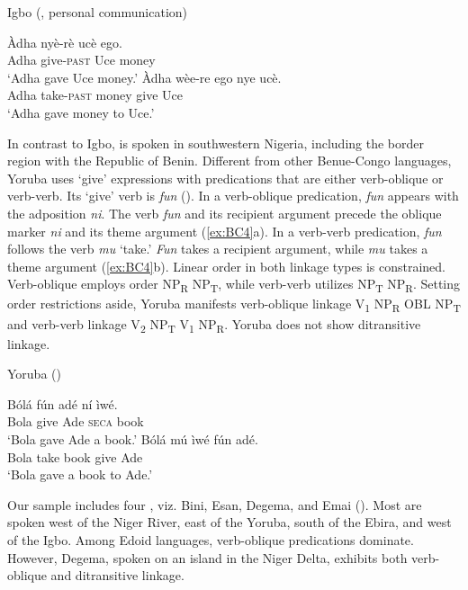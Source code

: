 \documentclass[output=paper,colorlinks,citecolor=brown]{langscibook}
\begin{document}
\ea \label{ex:BC3} Igbo (\cite[122]{Uwalaka1988}, personal communication)
\begin{xlist}
\ex
\gll Àdha		nyè-rè				ucè		ego.\\
						Adha		give-\textsc{past}		Uce		money\\
\glt						‘Adha gave Uce money.’
\ex 
\gll Àdha		wèe-re				ego			nye		ucè.\\
						Adha		take-\textsc{past}		money	give	Uce \\
\glt ‘Adha gave money to Uce.’
\end{xlist}
\z

In contrast to Igbo,  is spoken in southwestern Nigeria, including the border region with the Republic of Benin. Different from other Benue-Congo languages, Yoruba uses ‘give’ expressions with predications that are either verb-oblique or verb-verb. Its ‘give’ verb is \textit{fun} (\citealt{Atoyebietal2010, Lord1993}). In a verb-oblique predication, \textit{fun} appears with the adposition \textit{ni}. The verb \textit{fun} and its recipient argument precede the oblique marker \textit{ni} and its theme argument (\ref{ex:BC4}a). In a verb-verb predication, \textit{fun} follows the verb \textit{mu} ‘take.’ \textit{Fun} takes a recipient argument, while \textit{mu} takes a theme argument (\ref{ex:BC4}b). Linear order in both linkage types is constrained. Verb-oblique employs order NP\textsubscript{R} NP\textsubscript{T}, while verb-verb utilizes NP\textsubscript{T} NP\textsubscript{R}. Setting order restrictions aside, Yoruba manifests verb-oblique linkage V\textsubscript{1} NP\textsubscript{R} OBL NP\textsubscript{T} and verb-verb linkage V\textsubscript{2} NP\textsubscript{T} V\textsubscript{1} NP\textsubscript{R}. Yoruba does not show ditransitive linkage.

\ea \label{ex:BC4} Yoruba (\citealt[2, 148]{Atoyebietal2010})
\begin{xlist}
\ex
\gll Bólá		fún		adé		ní		ìwé.\\
						Bola	give		Ade		\textsc{seca}	book\\
\glt						‘Bola gave Ade a book.’
\ex 
\gll 	Bólá		mú		ìwé			fún		adé.\\
						Bola	take		book		give		Ade\\
\glt 							‘Bola gave a book to Ade.’
\end{xlist}
\z

Our sample includes four , viz. Bini, Esan, Degema, and Emai (\cite{Elugbe1989}). Most are spoken west of the Niger River, east of the Yoruba, south of the Ebira, and west of the Igbo. Among Edoid languages, verb-oblique predications dominate. However, Degema, spoken on an island in the Niger Delta, exhibits both verb-oblique and ditransitive linkage.
\end{document}
